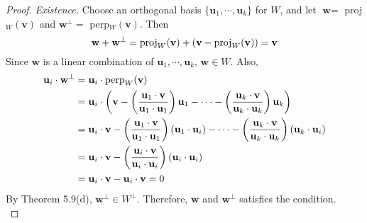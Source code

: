 \begin{proof}
	\textit{Existence.} Choose an orthogonal basis $\{\textbf{u}_1, \cdots, \textbf{u}_k \}$ for $W$, and let $\textbf{w} = $ proj$_W(\textbf{v})$ and $\textbf{w}^\perp = $ perp$_W(\textbf{v})$. Then \begin{equation*}
		\textbf{w} + \textbf{w}^\perp = \textnormal{proj}_W(\textbf{v}) + (\textbf{v} - \textnormal{proj}_W(\textbf{v})) = \textbf{v}
	\end{equation*} Since $\textbf{w}$ is a linear combination of $\textbf{u}_1, \cdots, \textbf{u}_k$, $\textbf{w} \in W$. Also, \begin{align*}
		\textbf{u}_i \cdot \textbf{w}^\perp &= \textbf{u}_i \cdot \textnormal{perp}_W(\textbf{v}) \\
		&= \textbf{u}_i \cdot \left (\textbf{v} - \left (\frac{\textbf{u}_1 \cdot \textbf{v}}{\textbf{u}_1 \cdot \textbf{u}_1} \right )\textbf{u}_1 - \cdots - \left (\frac{\textbf{u}_k \cdot \textbf{v}}{\textbf{u}_k \cdot \textbf{u}_k} \right )\textbf{u}_k \right ) \\
		&= \textbf{u}_i \cdot \textbf{v} - \left (\frac{\textbf{u}_1 \cdot \textbf{v}}{\textbf{u}_1 \cdot \textbf{u}_1} \right )(\textbf{u}_1 \cdot \textbf{u}_i) - \cdots - \left (\frac{\textbf{u}_k \cdot \textbf{v}}{\textbf{u}_k \cdot \textbf{u}_k} \right )(\textbf{u}_k \cdot \textbf{u}_i) \\
		&= \textbf{u}_i \cdot \textbf{v} - \left (\frac{\textbf{u}_i \cdot \textbf{v}}{\textbf{u}_i \cdot \textbf{u}_i} \right )(\textbf{u}_i \cdot \textbf{u}_i) \\
		&= \textbf{u}_i \cdot \textbf{v} - \textbf{u}_i \cdot \textbf{v} = 0
	\end{align*} By Theorem 5.9(d), $\textbf{w}^\perp \in W^\perp$. Therefore, $\textbf{w}$ and $\textbf{w}^\perp$ satisfies the condition.\\
	

\end{proof}
